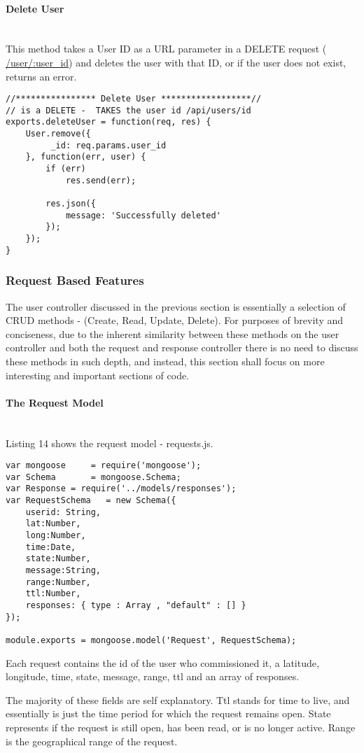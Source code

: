 \documentclass[a4paper]{article}
\newcommand{\subsubsubsection}[1]{\paragraph{#1}\mbox{}\\}
\begin{document}
\subsubsubsection{Delete User}
This method  takes a User ID as a URL parameter in a DELETE request ( \url{/user/:user_id}) and deletes the user with that ID, or if the user does not exist, returns an error.
\begin{lstlisting}[label=Delete User,caption=Delete User]
//**************** Delete User ******************//
// is a DELETE -  TAKES the user id /api/users/id
exports.deleteUser = function(req, res) {
    User.remove({
         _id: req.params.user_id
    }, function(err, user) {
        if (err)
            res.send(err);

        res.json({
            message: 'Successfully deleted'
        });
    });
}
\end{lstlisting}
\subsubsection{Request Based Features}
The user controller discussed in the previous section is essentially a selection of CRUD methods - (Create, Read, Update, Delete). For purposes of brevity and conciseness, due to the inherent similarity between these methods on the user controller and both the request and response controller there is no need to discuss these methods in such depth, and instead, this section shall focus on more interesting and important sections of code. 
\subsubsubsection{The Request Model}
Listing 14 shows the request model - requests.js.

\begin{lstlisting}[label=Request Model,caption=Request Model]
var mongoose     = require('mongoose');
var Schema       = mongoose.Schema;
var Response = require('../models/responses');
var RequestSchema   = new Schema({
    userid: String,
    lat:Number,
    long:Number,
    time:Date,
    state:Number,
    message:String,
    range:Number,
    ttl:Number,
    responses: { type : Array , "default" : [] }
});

module.exports = mongoose.model('Request', RequestSchema);
\end{lstlisting}

Each request contains the id of the user who commissioned it, a latitude, longitude, time, state, message, range, ttl and an array of responses.

The majority of these fields are self explanatory. Ttl stands for time to live, and essentially is just the time period for which the request remains open. State represents if the request is still open, has been read, or is no longer active. Range is the geographical range of the request.
\end{document}
